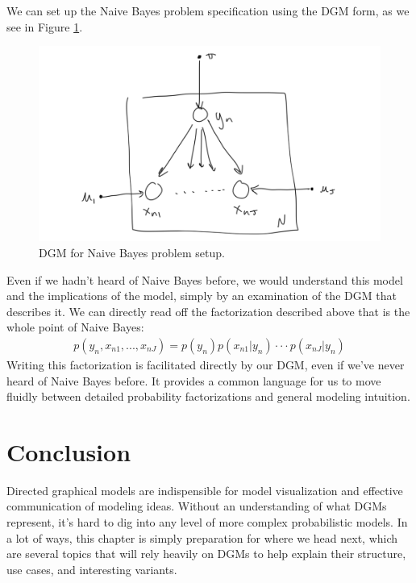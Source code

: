 We can set up the Naive Bayes problem specification using the DGM form, as we see in Figure \ref{fig:naive-bayes}.
\begin{figure}
	\centering
	\includegraphics[width=0.5\paperwidth]{../GraphicalModels/fig/naive-bayes-dgm.png}
    \caption{DGM for Naive Bayes problem setup.}
	\label{fig:naive-bayes}
\end{figure}

Even if we hadn't heard of Naive Bayes before, we would understand this model and the implications of the model, simply by an examination of the DGM that describes it. We can directly read off the factorization described above that is the whole point of Naive Bayes:
\begin{align*}
	p(y_n, x_{n1}, ..., x_{nJ}) = p(y_n) p(x_{n1} | y_n) \cdot \cdot \cdot p(x_{nJ} | y_n)
\end{align*}
Writing this factorization is facilitated directly by our DGM, even if we've never heard of Naive Bayes before. It provides a common language for us to move fluidly between detailed probability factorizations and general modeling intuition.

\section{Conclusion}
Directed graphical models are indispensible for model visualization and effective communication of modeling ideas. Without an understanding of what DGMs represent, it's hard to dig into any level of more complex probabilistic models. In a lot of ways, this chapter is simply preparation for where we head next, which are several topics that will rely heavily on DGMs to help explain their structure, use cases, and interesting variants.